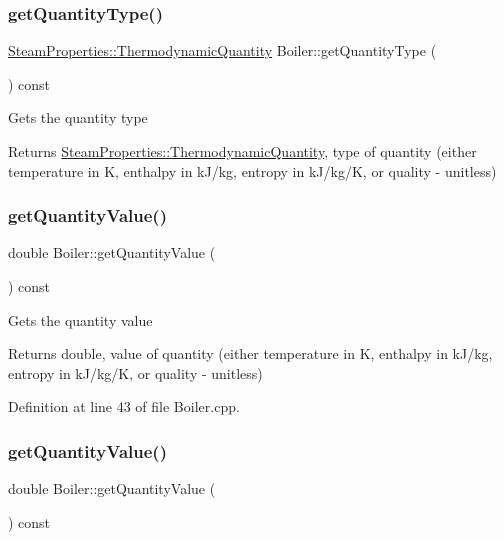 \subsubsection{\texorpdfstring{get\+Quantity\+Type()}{getQuantityType()}\hspace{0.1cm}{\footnotesize\ttfamily [3/3]}}
{\footnotesize\ttfamily \hyperlink{class_steam_properties_ae0294bedf7d178c2d8fb6aed0f62fbff}{Steam\+Properties\+::\+Thermodynamic\+Quantity} Boiler\+::get\+Quantity\+Type (\begin{DoxyParamCaption}{ }\end{DoxyParamCaption}) const}

Gets the quantity type \begin{DoxyReturn}{Returns}
\hyperlink{class_steam_properties_ae0294bedf7d178c2d8fb6aed0f62fbff}{Steam\+Properties\+::\+Thermodynamic\+Quantity}, type of quantity (either temperature in K, enthalpy in k\+J/kg, entropy in k\+J/kg/K, or quality -\/ unitless) 
\end{DoxyReturn}
\mbox{\label{class_boiler_a78370a174135e6cc95abcd3b7ac2f947}} 
\subsubsection{\texorpdfstring{get\+Quantity\+Value()}{getQuantityValue()}\hspace{0.1cm}{\footnotesize\ttfamily [1/3]}}
{\footnotesize\ttfamily double Boiler\+::get\+Quantity\+Value (\begin{DoxyParamCaption}{ }\end{DoxyParamCaption}) const}

Gets the quantity value \begin{DoxyReturn}{Returns}
double, value of quantity (either temperature in K, enthalpy in k\+J/kg, entropy in k\+J/kg/K, or quality -\/ unitless) 
\end{DoxyReturn}


Definition at line 43 of file Boiler.\+cpp.

\mbox{\label{class_boiler_a78370a174135e6cc95abcd3b7ac2f947}} 
\subsubsection{\texorpdfstring{get\+Quantity\+Value()}{getQuantityValue()}\hspace{0.1cm}{\footnotesize\ttfamily [2/3]}}
{\footnotesize\ttfamily double Boiler\+::get\+Quantity\+Value (\begin{DoxyParamCaption}{ }\end{DoxyParamCaption}) const}

